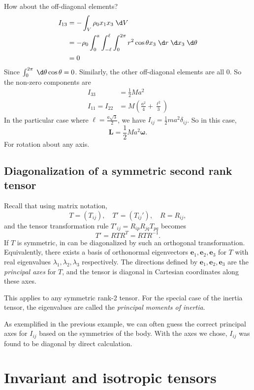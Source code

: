 \documentclass[a4paper]{article}
\begin{document}
\begin{eg}
  How about the off-diagonal elements?
  \begin{align*}
    I_{13} &= -\int_V \rho_0 x_1 x_3 \;\d V\\
    &= -\rho_0 \int_0^a \int_{-\ell}^\ell \int_0^{2\pi} r^2 \cos \theta x_3 \;\d r\;\d x_3 \;\d \theta\\
    &= 0
  \end{align*}
  Since $\int_0^{2\pi} \;\d \theta \cos \theta = 0$. Similarly, the other off-diagonal elements are all 0. So the non-zero components are
  \begin{align*}
    I_{33} &= \frac{1}{2}Ma^2\\
    I_{11} = I_{22} &= M\left(\frac{a^2}{4} + \frac{\ell^2}{3}\right)
  \end{align*}
  In the particular case where $\ell = \frac{a\sqrt{3}}{2}$, we have $I_{ij} = \frac{1}{2}ma^2 \delta_{ij}$. So in this case,
  \[
    \mathbf{L} = \frac{1}{2}Ma^2 \boldsymbol\omega.
  \]
  For rotation about any axis.
\end{eg}

\subsection{Diagonalization of a symmetric second rank tensor}
Recall that using matrix notation,
\[
  T = (T_{ij}),\quad T' = (T_{ij}'),\quad R = R_{ij},
\]
and the tensor transformation rule $T'_{ij} = R_{ip}R_{jq}T_{pq}$ becomes
\[
  T' = RTR^T = RTR^{-1}.
\]
If $T$ is symmetric, in can be diagonalized by such an orthogonal transformation. Equivalently, there exists a basis of orthonormal eigenvectors $\mathbf{e}_1, \mathbf{e}_2, \mathbf{e}_3$ for $T$ with real eigenvalues $\lambda_1, \lambda_2, \lambda_3$ respectively. The directions defined by $\mathbf{e}_1, \mathbf{e}_2, \mathbf{e}_3$ are the \emph{principal axes} for $T$, and the tensor is diagonal in Cartesian coordinates along these axes.

This applies to any symmetric rank-2 tensor. For the special case of the inertia tensor, the eigenvalues are called the \emph{principal moments of inertia}.

As exemplified in the previous example, we can often guess the correct principal axes for $I_{ij}$ based on the symmetries of the body. With the axes we chose, $I_{ij}$ was found to be diagonal by direct calculation.

\section{Invariant and isotropic tensors}
\end{document}
